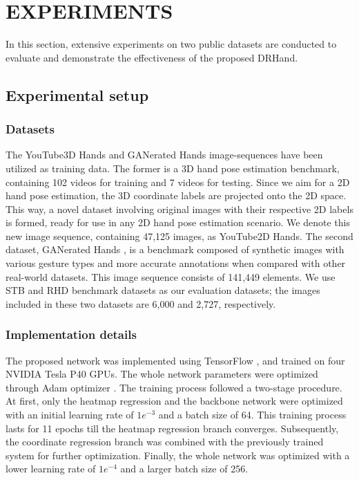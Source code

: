 \documentclass[11pt]{article}
\begin{document}
\section{EXPERIMENTS}
In this section, extensive experiments on two public datasets are conducted to evaluate and demonstrate the effectiveness of the proposed DRHand.

\subsection{Experimental setup}
\subsubsection{Datasets}
The YouTube3D Hands \cite{ref41} and GANerated Hands \cite{ref30} image-sequences have been utilized as training data. The former is a 3D hand pose estimation benchmark, containing 102 videos for training and 7 videos for testing. Since we aim for a 2D hand pose estimation, the 3D coordinate labels are projected onto the 2D space. This way, a novel dataset involving original images with their respective 2D labels is formed, ready for use in any 2D hand pose estimation scenario. We denote this new image sequence, containing 47,125 images, as YouTube2D Hands. The second dataset, GANerated Hands \cite{ref30}, is a benchmark composed of synthetic images with various gesture types and more accurate annotations when compared with other real-world datasets. This image sequence consists of 141,449 elements. We use STB \cite{ref42} and RHD \cite{ref32} benchmark datasets as our evaluation datasets; the images included in these two datasets are 6,000 and 2,727, respectively.

\subsubsection{Implementation details}
The proposed network was implemented using TensorFlow \cite{ref43}, and trained on four NVIDIA Tesla P40 GPUs. The whole network parameters were optimized through Adam optimizer \cite{ref44}. The training process followed a two-stage procedure. At first, only the heatmap regression and the backbone network were optimized with an initial learning rate of $1e^{-3}$ and a batch size of 64. This training process lasts for 11 epochs till the heatmap regression branch converges. Subsequently, the coordinate regression branch was combined with the previously trained system for further optimization. Finally, the whole network was optimized with a lower learning rate of $1e^{-4}$ and a larger batch size of 256.
\end{document}
